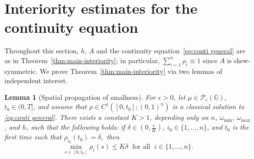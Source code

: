 \documentclass[10pt]{article}
\newtheorem{lemma}[theorem]{Lemma}
\numberwithin{equation}{section}
\newcommand{\cP}{ \mathcal{P}}
\newcommand{\bG}{\mathbb G}
\begin{document}
\section{Interiority estimates  for the continuity equation}\label{sec:interiority}
Throughout this section, $h$, $A$ and the continuity equation~\eqref{eq:conti general} are as in Theorem~\ref{thm:main-interiority}; in particular, $\sum_{i=1}^n\rho_i\equiv1$ since $A$ is skew-symmetric. We prove Theorem~\ref{thm:main-interiority} via two lemmas of independent interest.
%
\begin{lemma}[Spatial propagation of smallness]\label{lem:interiority 1} For $\epsilon>0$, let $\mu \in \cP_\epsilon(\bG)$, $t_0 \in (0,T]$, and assume that $\rho\in C^1([0,t_0]; (0,1)^n)$ is a classical solution to \eqref{eq:conti general}. There exists a constant $K>1$, depending only on $n$, $\omega_{\min}$, $\omega_{\max}$, and $h$, such that the following holds: if $\delta \in (0,\frac{\epsilon}{K})$, $i_0\in \{1,\ldots,n\}$, and $t_0$ is the first time such that $ \rho_{i_0}(t_0)=\delta,$ 
then
\begin{equation}
    \min_{s\in[0,t_0]}\rho_i(s)\leq K\delta \;\text{ for all }\; i\in\{1,\ldots,n\}.
\end{equation}
\end{lemma}
\end{document}
